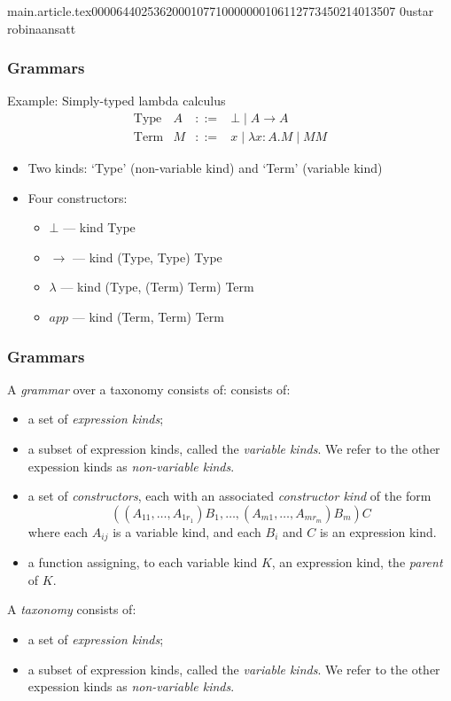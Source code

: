 main.article.tex                                                                                    0000644 0253620 0010771 00000001061 12773450214 013507  0                                                                                                    ustar   robina                          ansatt                                                                                                                                                                                                                 \documentclass{article}
\begin{document}
\begin{frame}[fragile]
\frametitle{Grammars}
Example: Simply-typed lambda calculus
\[ \begin{array}{lrcl}
\text{Type} & A & ::= & \bot \mid A \rightarrow A \\
\text{Term} & M & ::= & x \mid \lambda x:A.M \mid M M
\end{array} \]

\begin{itemize}
\item
Two kinds: `Type' (non-variable kind) and `Term' (variable kind)
\item
Four constructors:
\begin{itemize}
\item
$\bot$ --- kind Type
\item
$\rightarrow$ --- kind (Type, Type) Type
\item
$\lambda$ --- kind (Type, (Term) Term) Term
\item
$app$ --- kind (Term, Term) Term
\end{itemize}
\end{itemize}
\end{frame}

\begin{frame}
\frametitle{Grammars}
A \emph{grammar} over a taxonomy consists of: consists of:
\begin{itemize}
\item a set of \emph{expression kinds};
\item a subset of expression kinds, called the \emph{variable kinds}.  We refer to the other expession kinds as \emph{non-variable kinds}.
\item a set of \emph{constructors}, each with an associated \emph{constructor kind} of the form
\begin{equation}
\label{eq:conkind}
 ((A_{11}, \ldots, A_{1r_1}) B_1, \ldots, (A_{m1}, \ldots, A_{mr_m}) B_m) C
\end{equation}
where each $A_{ij}$ is a variable kind, and each $B_i$ and $C$ is an expression kind.
\item a function assigning, to each variable kind $K$, an expression kind, the \emph{parent} of $K$.
\end{itemize}
\end{frame}

\begin{frame}[fragile]
A \emph{taxonomy } consists of:
\begin{itemize}
\item a set of \emph{expression kinds};
\item a subset of expression kinds, called the \emph{variable kinds}.  We refer to the other expession kinds as \emph{non-variable kinds}.
\end{itemize}
\end{frame}
\end{document}

